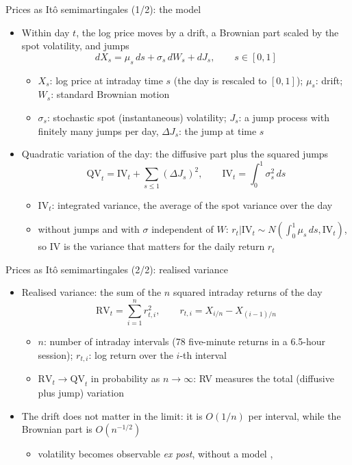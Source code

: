 \begin{frame}{Prices as Itô semimartingales (1/2): the model}
\itemsize{\small}
\begin{itemize}
    \item Within day $t$, the log price moves by a drift, a Brownian part scaled by the spot volatility, and jumps
    \[ dX_s = \mu_s\,ds + \sigma_s\,dW_s + dJ_s, \qquad s \in [0, 1] \]
    \begin{itemize}
        \item $X_s$: log price at intraday time $s$ (the day is rescaled to $[0, 1]$); $\mu_s$: drift; $W_s$: standard Brownian motion
        \item $\sigma_s$: stochastic spot (instantaneous) volatility; $J_s$: a jump process with finitely many jumps per day, $\Delta J_s$: the jump at time $s$
    \end{itemize}
    \item Quadratic variation of the day: the diffusive part plus the squared jumps
    \[ \mathrm{QV}_t = \mathrm{IV}_t + \sum_{s \le 1}(\Delta J_s)^2, \qquad \mathrm{IV}_t = \int_0^1\sigma^2_s\,ds \]
    \begin{itemize}
        \item $\mathrm{IV}_t$: integrated variance, the average of the spot variance over the day
        \item without jumps and with $\sigma$ independent of $W$: $r_t | \mathrm{IV}_t \sim N(\int_0^1\mu_s\,ds, \mathrm{IV}_t)$, so IV is the variance that matters for the daily return $r_t$
    \end{itemize}
\end{itemize}
\end{frame}

\begin{frame}{Prices as Itô semimartingales (2/2): realised variance}
\itemsize{\small}
\begin{itemize}
    \item Realised variance: the sum of the $n$ squared intraday returns of the day
    \[ \mathrm{RV}_t = \sum_{i=1}^n r_{t,i}^2, \qquad r_{t,i} = X_{i/n} - X_{(i-1)/n} \]
    \begin{itemize}
        \item $n$: number of intraday intervals (78 five-minute returns in a 6.5-hour session); $r_{t,i}$: log return over the $i$-th interval
        \item $\mathrm{RV}_t \to \mathrm{QV}_t$ in probability as $n \to \infty$: RV measures the total (diffusive plus jump) variation
    \end{itemize}
    \item The drift does not matter in the limit: it is $O(1/n)$ per interval, while the Brownian part is $O(n^{-1/2})$
    \begin{itemize}
        \item volatility becomes observable \emph{ex post}, without a model , 
    \end{itemize}
\end{itemize}
\end{frame}

